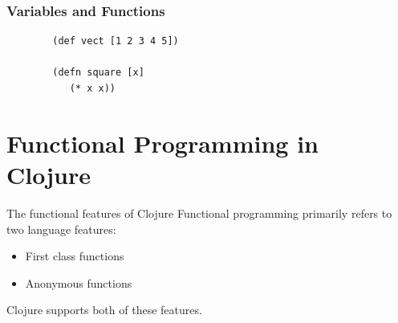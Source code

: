 \documentclass[xcolor=dvipsnames]{beamer}
\begin{document}
		\begin{frame}[fragile]
		\frametitle{Variables and Functions}
		\begin{verbatim}
		(def vect [1 2 3 4 5])
		
		(defn square [x] 
		   (* x x))
		\end{verbatim}	
		\end{frame}
		
		
		
%
%					
%
	\section{Functional Programming in Clojure}
		\begin{frame}{The functional features of Clojure}
			Functional programming primarily refers to two language features:
			\begin{itemize}
			\item First class functions
			\item Anonymous functions
			\end{itemize}		
			Clojure supports both of these features.
		\end{frame}
\end{document}
